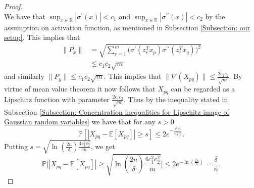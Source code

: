 \documentclass[a4paper,11pt]{amsart}
\newcommand{\IE}{\mathbb{E}}
\newcommand{\IP}{\mathbb{P}}
\theoremstyle{definition}
\theoremstyle{plain}
\theoremstyle{remark}
\newcommand{\IR}{\mathbb{R}}
\begin{document}
\begin{proof}
\begin{equation}
\end{equation}                                                                                                                                                                                                                                                                             We have that $\sup_{x\in\IR}|\sigma^\prime(x)|< c_1$ and $\sup_{x\in\IR}|\sigma^{\prime\prime}(x)|<c_2$ by the assumption on activation function, as mentioned in Subsection \ref{Subsection: our setup}. This implies that \begin{equation}\begin{split}\|P_x\|&=\sqrt{\sum_{r=1}^m\Big(\sigma^{\prime}(z_r^Tx_p)\sigma^{\prime\prime}(z_r^Tx_q)\Big)^2}\\&\leq c_1c_2\sqrt{m}\end{split}\end{equation} and similarly $\|P_y\|\leq c_1c_2\sqrt{m}$. This implies that $\|\nabla(X_{pq})\|\leq\frac{2c_1c_2}{\sqrt{m}}$.                                                                                                                                                                                                                            By virtue of mean value theorem it now follows that $X_{pq}$ can be regarded as a Lipschitz function with parameter $\frac{2c_1c_2}{\sqrt{m}}$. Thus by the inequality stated in Subsection \ref{Subsection: Concentration inequalities for Lipschitz image of Gaussian random variables} we have that for any $s>0$
                                                                                                                                                                                                                                                                             \[
                                                                                                                                                                                                                                                                  \IP[|X_{pq}-\IE[X_{pq}]|\geq s]\leq2e^{-\frac{s^2m}{4c_1^2c_2^2}}. 
                                                                                                                                                                                                                                                                             \]
Putting $s=\sqrt{\ln(\frac{2n}{\delta})\frac{4c_1^2c_2^2}{m}}$, we get 
\[
\IP\Big[|X_{pq}-\IE[X_{pq}]|\geq \sqrt{\ln(\frac{2n}{\delta})\frac{4c_1^2c_2^2}{m}}\Big]\leq 2e^{-\ln(\frac{2n}{\delta})}=\frac{\delta}{n}. 
\]
\end{proof}
\end{document}
